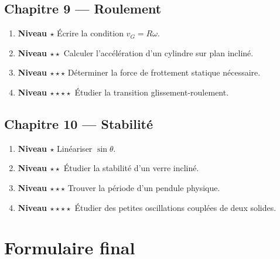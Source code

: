 \documentclass[11pt,a4paper]{article}
\newcommand{\niveau}[1]{\textbf{Niveau #1}}
\begin{document}
\subsection*{Chapitre 9 — Roulement}
\begin{enumerate}
  \item \niveau{$\star$} Écrire la condition $v_G=R\omega$.
  \item \niveau{$\star\star$} Calculer l'accélération d'un cylindre sur plan incliné.
  \item \niveau{$\star\star\star$} Déterminer la force de frottement statique nécessaire.
  \item \niveau{$\star\star\star\star$} Étudier la transition glissement-roulement.
\end{enumerate}

\subsection*{Chapitre 10 — Stabilité}
\begin{enumerate}
  \item \niveau{$\star$} Linéariser $\sin\theta$.
  \item \niveau{$\star\star$} Étudier la stabilité d'un verre incliné.
  \item \niveau{$\star\star\star$} Trouver la période d'un pendule physique.
  \item \niveau{$\star\star\star\star$} Étudier des petites oscillations couplées de deux solides.
\end{enumerate}

\section{Formulaire final}
\end{document}
